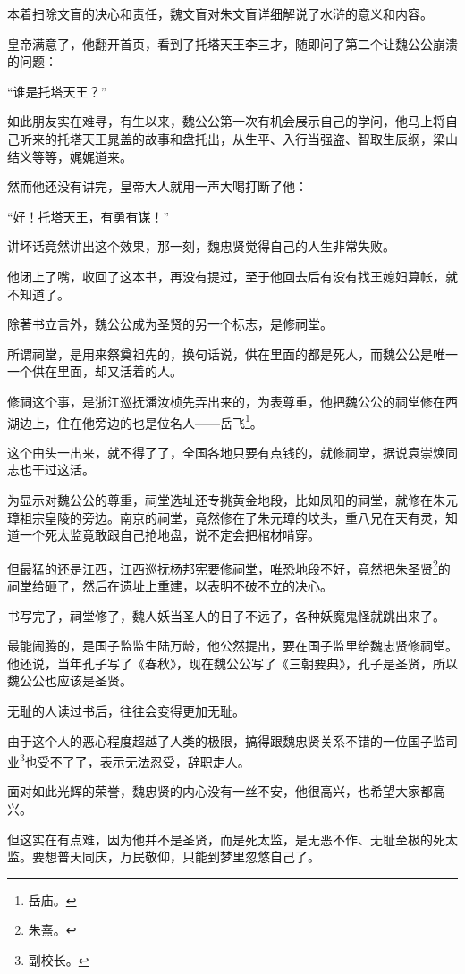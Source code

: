 \begin{multicols}{\theparacolNo}
		本着扫除文盲的决心和责任，魏文盲对朱文盲详细解说了水浒的意义和内容。

		皇帝满意了，他翻开首页，看到了托塔天王李三才，随即问了第二个让魏公公崩溃的问题：

		“谁是托塔天王？”

		如此朋友实在难寻，有生以来，魏公公第一次有机会展示自己的学问，他马上将自己听来的托塔天王晁盖的故事和盘托出，从生平、入行当强盗、智取生辰纲，梁山结义等等，娓娓道来。

		然而他还没有讲完，皇帝大人就用一声大喝打断了他：

		“好！托塔天王，有勇有谋！”

		讲坏话竟然讲出这个效果，那一刻，魏忠贤觉得自己的人生非常失败。

		他闭上了嘴，收回了这本书，再没有提过，至于他回去后有没有找王媳妇算帐，就不知道了。

		除著书立言外，魏公公成为圣贤的另一个标志，是修祠堂。

		所谓祠堂，是用来祭奠祖先的，换句话说，供在里面的都是死人，而魏公公是唯一一个供在里面，却又活着的人。

		修祠这个事，是浙江巡抚潘汝桢先弄出来的，为表尊重，他把魏公公的祠堂修在西湖边上，住在他旁边的也是位名人——岳飞\footnote{岳庙。}。

		这个由头一出来，就不得了了，全国各地只要有点钱的，就修祠堂，据说袁崇焕同志也干过这活。

		为显示对魏公公的尊重，祠堂选址还专挑黄金地段，比如凤阳的祠堂，就修在朱元璋祖宗皇陵的旁边。南京的祠堂，竟然修在了朱元璋的坟头，重八兄在天有灵，知道一个死太监竟敢跟自己抢地盘，说不定会把棺材啃穿。

		但最猛的还是江西，江西巡抚杨邦宪要修祠堂，唯恐地段不好，竟然把朱圣贤\footnote{朱熹。}的祠堂给砸了，然后在遗址上重建，以表明不破不立的决心。

		书写完了，祠堂修了，魏人妖当圣人的日子不远了，各种妖魔鬼怪就跳出来了。

		最能闹腾的，是国子监监生陆万龄，他公然提出，要在国子监里给魏忠贤修祠堂。他还说，当年孔子写了《春秋》，现在魏公公写了《三朝要典》，孔子是圣贤，所以魏公公也应该是圣贤。

		无耻的人读过书后，往往会变得更加无耻。

		由于这个人的恶心程度超越了人类的极限，搞得跟魏忠贤关系不错的一位国子监司业\footnote{副校长。}也受不了了，表示无法忍受，辞职走人。

		面对如此光辉的荣誉，魏忠贤的内心没有一丝不安，他很高兴，也希望大家都高兴。

		但这实在有点难，因为他并不是圣贤，而是死太监，是无恶不作、无耻至极的死太监。要想普天同庆，万民敬仰，只能到梦里忽悠自己了。


\end{multicols}
